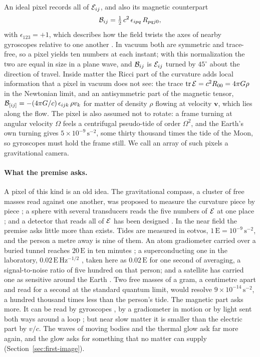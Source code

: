 An ideal pixel records all of $\mathcal{E}_{ij}$, and also its magnetic counterpart
\begin{equation}\label{eq:magnetic}
\mathcal{B}_{ij} = \tfrac{1}{2}\,c^2\,\epsilon_{ipq}\,R_{pqj0},
\end{equation}
with $\epsilon_{123} = +1$, which describes how the field twists the axes of
nearby gyroscopes relative to one another \cite{Nichols2011}. In vacuum both
are symmetric and trace-free, so
a pixel yields ten numbers at each instant; with this normalization the two are
equal in size in a plane wave, and $\mathcal{B}_{ij}$ is $\mathcal{E}_{ij}$ turned by
$45^\circ$ about the direction of travel. Inside matter the Ricci part of the
curvature adds local information that a pixel in vacuum does not see: the
trace $\mathrm{tr}\,\mathcal{E} = c^2R_{00} = 4\pi G\rho$ in the Newtonian limit, and an
antisymmetric part of the magnetic tensor, $\mathcal{B}_{[ij]} = -(4\pi
G/c)\,\epsilon_{ijk}\,\rho v_k$ for matter of density $\rho$ flowing at
velocity $\mathbf v$, which lies along the flow. The pixel is also assumed
not to rotate: a frame turning at angular velocity $\Omega$ feels a
centrifugal pseudo-tide of order $\Omega^2$, and the Earth's own turning gives
$5\times10^{-9}\,\mathrm{s^{-2}}$, some thirty thousand times the tide of the
Moon, so gyroscopes must hold the frame still. We call an array of such pixels a
gravitational camera.

\paragraph{What the premise asks.} A pixel of this kind is an old idea. The
gravitational compass, a cluster of free masses read against one another, was
proposed to measure the curvature piece by piece
\cite{Pirani1956,Szekeres1965}; a sphere with several transducers reads the five
numbers of $\mathcal{E}$ at one place
\cite{Forward1971,WagonerPaik1977,MerkowitzJohnson1995}; and a detector
that reads all of $\mathcal{E}$ has been designed \cite{Paik2016}. In the near field
the premise asks little more than exists. Tides are measured in eotvos,
$1\,\mathrm{E} = 10^{-9}\,\mathrm{s^{-2}}$, and the person a metre away is nine
of them. An atom gradiometer carried over a buried tunnel reaches
$20\,\mathrm{E}$ in ten minutes \cite{Stray2022}; a superconducting one in the
laboratory, $0.02\,\mathrm{E\,Hz^{-1/2}}$ \cite{MoodyPaikCanavan2002},
taken here as $0.02\,\mathrm{E}$ for one second of averaging, a
signal-to-noise ratio of five hundred on that person; and a satellite has
carried one as sensitive around the Earth \cite{RummelYiStummer2011}. Two free
masses of a gram, a centimetre apart and read for a second at the standard
quantum limit, would resolve $9\times10^{-14}\,\mathrm{s^{-2}}$, a hundred
thousand times less than the person's tide. The magnetic part asks more. It
can be read by gyroscopes \cite{Nichols2011}, by a gradiometer in motion
\cite{BraginskyCavesThorne1977,MashhoonPaikWill1989} or by light sent both ways
around a loop \cite{Frauendiener2020}; but near slow matter it is smaller
than the electric part by $v/c$. The waves of moving bodies and the thermal
glow ask far more again, and the glow asks for something that no matter can
supply (Section~\ref{sec:first-image}).

